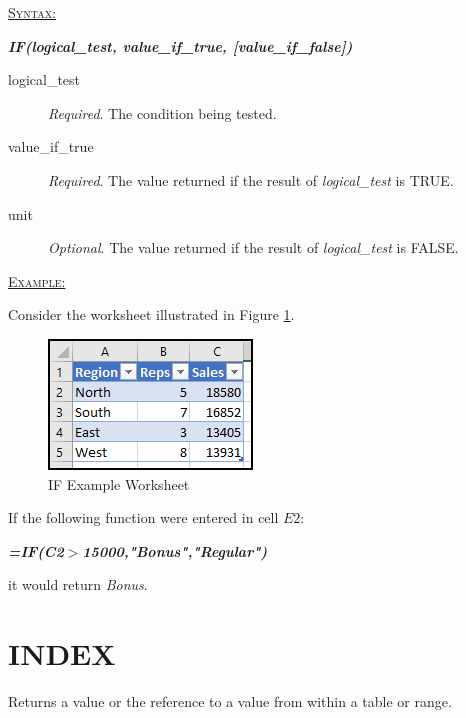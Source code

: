 \begin{addmargin}[1cm]{0cm}

	\medskip
	\underline{\textsc{Syntax:}}
	\medskip

	{\color{Syntax}
		\noindent\textbf{\textit{IF(logical\_test, value\_if\_true, [value\_if\_false])}}
	}
	
	\begin{description}
		\item[logical\_test] \textit{Required}. The condition being tested.
		\item[value\_if\_true] \textit{Required}. The value returned if the result of \textit{logical\_test} is TRUE.
		\item[unit] \textit{Optional}. The value returned if the result of \textit{logical\_test} is FALSE. 
	\end{description}

	\medskip
	\noindent\underline{\textsc{Example:}}
	\medskip
	
	\noindent Consider the worksheet illustrated in Figure \ref{apa:if}.
	
	\begin{figure}[H]
		\centering
		\includegraphics[width=\maxwidth{.45\linewidth}]{gfx/apa_fig01}
		\caption{IF Example Worksheet}
		\label{apa:if}
	\end{figure}
	
	\noindent If the following function were entered in cell $ E2 $:
	
	{\color{Syntax}
		\textit{\textbf{=IF(C2$ > $15000,"Bonus","Regular")}}
	}
	
	\noindent it would return \textit{Bonus}.

\end{addmargin}

\section{INDEX}

Returns a value or the reference to a value from within a table or range.

